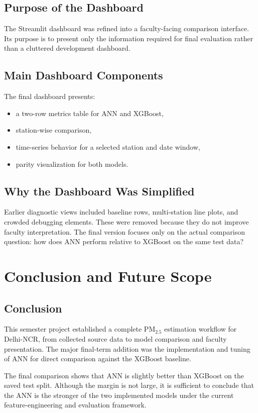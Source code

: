 \documentclass[12pt,a4paper]{report}
\begin{document}
\section{Purpose of the Dashboard}
The Streamlit dashboard was refined into a faculty-facing comparison interface. Its purpose is to present only the information required for final evaluation rather than a cluttered development dashboard.

\section{Main Dashboard Components}
The final dashboard presents:

\begin{itemize}[leftmargin=1.3cm]
    \item a two-row metrics table for ANN and XGBoost,
    \item station-wise comparison,
    \item time-series behavior for a selected station and date window,
    \item parity visualization for both models.
\end{itemize}

\section{Why the Dashboard Was Simplified}
Earlier diagnostic views included baseline rows, multi-station line plots, and crowded debugging elements. These were removed because they do not improve faculty interpretation. The final version focuses only on the actual comparison question: how does ANN perform relative to XGBoost on the same test data?

\chapter{Conclusion and Future Scope}

\section{Conclusion}
This semester project established a complete PM$_{2.5}$ estimation workflow for Delhi-NCR, from collected source data to model comparison and faculty presentation. The major final-term addition was the implementation and tuning of ANN for direct comparison against the XGBoost baseline.

The final comparison shows that ANN is slightly better than XGBoost on the saved test split. Although the margin is not large, it is sufficient to conclude that the ANN is the stronger of the two implemented models under the current feature-engineering and evaluation framework.
\end{document}
